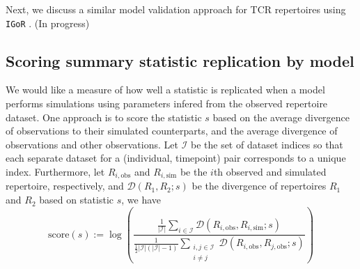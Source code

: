 \documentclass{article}
\begin{document}
Next, we discuss a similar model validation approach for TCR repertoires using \texttt{IGoR} \cite{Marcou2018-du}.
(In progress)

\subsection*{Scoring summary statistic replication by model}
We would like a measure of how well a statistic is replicated when a model performs simulations using parameters infered from the observed repertoire dataset.
One approach is to score the statistic $s$ based on the average divergence of observations to their simulated counterparts, and the average divergence of observations and other observations.
Let $\mathcal I$ be the set of dataset indices so that each separate dataset for a (individual, timepoint) pair corresponds to a unique index.
Furthermore, let $R_{i, \text{obs}}$ and $R_{i, \text{sim}}$ be the $i$th observed and simulated repertoire, respectively, and $\mathcal D(R_1, R_2; s)$ be the divergence of repertoires $R_1$ and $R_2$ based on statistic $s$, we have
\begin{equation}
    \text{score}(s) := \log \left( \frac{ \frac{1}{|\mathcal I|} \sum_{i \in \mathcal I} \mathcal D \left( R_{i, \text{obs}}, R_{i, \text{sim}} ; s\right) }
    { \frac{1}{\frac{1}{2} |\mathcal I|\left(|\mathcal I| - 1\right)}
        \sum_{\substack{i, j \in \mathcal I \\ i \ne j}} \mathcal D\left(R_{i, \text{obs}}, R_{j, \text{obs}}; s\right) } \right)
\end{equation}
\end{document}
